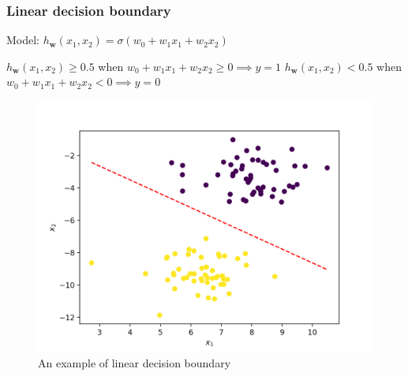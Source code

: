 \documentclass{beamer}
\begin{document}
	\begin{frame}
		\frametitle{Linear decision boundary}
		Model: $h_{\bm{w}}(x_1, x_2) = \sigma(w_0 + w_1 x_1 + w_2 x_2)$
		
		\vspace{2mm}
		
		$h_{\bm{w}}(x_1, x_2) \geq 0.5$ when $w_0 + w_1 x_1 + w_2 x_2 \geq 0 \implies y = 1$
		$h_{\bm{w}}(x_1, x_2) < 0.5$ when $w_0 + w_1 x_1 + w_2 x_2 < 0 \implies y = 0$
		
		\begin{figure}
			\centering
			\includegraphics[scale=0.5]{images/linear_decision_boundary}
			\caption{An example of linear decision boundary}
		\end{figure}
	\end{frame}
\end{document}
